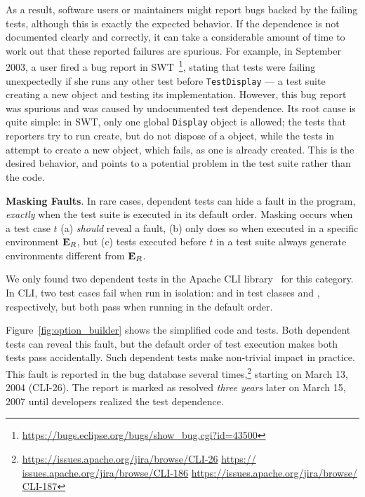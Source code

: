 As a result, software users or maintainers
might report bugs backed by the failing tests, although this
is exactly the expected behavior. 
If the dependence is not documented clearly and
correctly, it can take a considerable amount of time to work out that
these reported failures are spurious.
For example,
in September 2003, a user fired a
bug report in SWT~\cite{swt}\footnote{\url{https://bugs.eclipse.org/bugs/show_bug.cgi?id=43500}},
stating that tests were failing unexpectedly
if she runs any other test before \texttt{TestDisplay} --- 
a test suite creating a new  object and testing its
implementation. However, this bug report was spurious and was
caused by undocumented test dependence.
Its root cause is quite simple: in SWT, only one global \texttt{Display}
object is allowed; the tests that reporters try to run
create, but do not dispose of a  object, while
the tests in  attempt to create
a new  object, which fails, as one
is already created. This is the desired behavior,
and points to a potential problem in the test suite rather
than the code.

\vspace{1mm}

\noindent \textbf{Masking Faults}. In rare cases,
dependent tests can hide a fault in the
program, \emph{exactly} when the test suite is executed in its default
order. Masking occurs when a test case $t$ (a) \emph{should}
reveal a fault, (b) only does so when executed in a specific environment
$\mathbf{E}_R$, but (c) tests executed before $t$ in a test suite always
generate environments different from
$\mathbf{E}_R$.



We only found two dependent tests in
the Apache CLI library~\cite{cli} for this category.
In CLI, two test cases fail when run in isolation:
 and  in test
classes  and ,
respectively, but both pass when running in the default order.

Figure~\ref{fig:option_builder} shows the simplified code and
tests. Both dependent tests can reveal this fault,  but
the default order of test execution makes both tests pass
accidentally. Such dependent tests
make non-trivial impact in practice.
This fault is reported in the bug
database several times,\footnote{\url{https://issues.apache.org/jira/browse/CLI-26} \url{https://
issues.apache.org/jira/browse/CLI-186} \url{https://issues.apache.org/jira/browse/
CLI-187}} starting on March 13, 2004 (CLI-26). The report is marked as resolved
\emph{three years} later on March 15, 2007 until developers
realized the test dependence.

